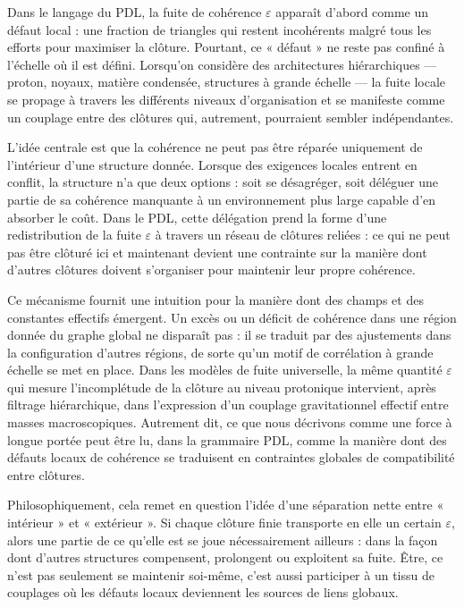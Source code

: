 \documentclass[11pt,a4paper]{article}
\theoremstyle{definition}
\begin{document}
Dans le langage du PDL, la fuite de cohérence \(\varepsilon\) apparaît d’abord comme un défaut local : une fraction de triangles qui restent incohérents malgré tous les efforts pour maximiser la clôture.\cite{Laubscher_Leakage_Probability_2024} Pourtant, ce « défaut » ne reste pas confiné à l’échelle où il est défini. Lorsqu’on considère des architectures hiérarchiques — proton, noyaux, matière condensée, structures à grande échelle — la fuite locale se propage à travers les différents niveaux d’organisation et se manifeste comme un couplage entre des clôtures qui, autrement, pourraient sembler indépendantes.\cite{Laubscher_Exponent18_v2_2024,Laubscher_UniversalCoherenceLeakage_2024}

L’idée centrale est que la cohérence ne peut pas être réparée uniquement de l’intérieur d’une structure donnée. Lorsque des exigences locales entrent en conflit, la structure n’a que deux options : soit se désagréger, soit déléguer une partie de sa cohérence manquante à un environnement plus large capable d’en absorber le coût. Dans le PDL, cette délégation prend la forme d’une redistribution de la fuite \(\varepsilon\) à travers un réseau de clôtures reliées : ce qui ne peut pas être clôturé ici et maintenant devient une contrainte sur la manière dont d’autres clôtures doivent s’organiser pour maintenir leur propre cohérence.\cite{Laubscher_EffectiveFields_2024}

Ce mécanisme fournit une intuition pour la manière dont des champs et des constantes effectifs émergent. Un excès ou un déficit de cohérence dans une région donnée du graphe global ne disparaît pas : il se traduit par des ajustements dans la configuration d’autres régions, de sorte qu’un motif de corrélation à grande échelle se met en place. Dans les modèles de fuite universelle, la même quantité \(\varepsilon\) qui mesure l’incomplétude de la clôture au niveau protonique intervient, après filtrage hiérarchique, dans l’expression d’un couplage gravitationnel effectif entre masses macroscopiques.\cite{Laubscher_UniversalCoherenceLeakage_2024} Autrement dit, ce que nous décrivons comme une force à longue portée peut être lu, dans la grammaire PDL, comme la manière dont des défauts locaux de cohérence se traduisent en contraintes globales de compatibilité entre clôtures.

Philosophiquement, cela remet en question l’idée d’une séparation nette entre « intérieur » et « extérieur ». Si chaque clôture finie transporte en elle un certain \(\varepsilon\), alors une partie de ce qu’elle est se joue nécessairement ailleurs : dans la façon dont d’autres structures compensent, prolongent ou exploitent sa fuite. Être, ce n’est pas seulement se maintenir soi-même, c’est aussi participer à un tissu de couplages où les défauts locaux deviennent les sources de liens globaux.\cite{Laubscher_Existence_PulsatingClosure_2026,Laubscher_PDL_Position_2024}
\end{document}
